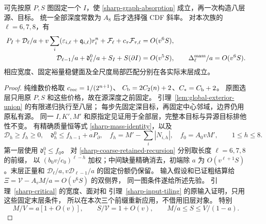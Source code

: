 \begin{lemma}[同一八层族的三个前缀]\label{eighth:priors}
可先按原 \(P,S\) 图固定一个 \(I\)，使
\eqref{sharp-graph-absorption} 成立，再一次构造八层源、目标。
统一全部深度常数为 \(A_8\) 后才选择强 CDF 斜率。
对本次族的 \(\ell=6,7,8\)，有
\begin{align}
 P_I+\mathcal D_\ell/a+v\sum_i(\varepsilon_{i,\ell}+\mathfrak q_{i,\ell})r_i^n
 +\mathcal F_\ell+c_\tau\mathcal F_{\tau,\ell}&=O(v^6S),
 \label{eighth:positive-prior}\\
 \mathcal D_{\ell-1}/a+\mathfrak d_\ell^0/a+S_I+S(\partial I)&=O(v^5S),
 \qquad \Delta_\ell^{\rm mass}/a=O(v^6S).
 \label{eighth:mass-prior}
\end{align}
相应宽度、固定裕量稳健面及全尺度局部匹配分别在各实际末层成立。
\end{lemma}
\begin{proof}
纯维数价格取 \(c_{\rm rec}=1/(2^{n+1})\)、
\(C_{\rm b}=2C_2(n)+2\)、\(C_*=C_{\rm b}+2\)。
原图选层只用原 \(P,S\) 和这些价格，故在源深度之前固定。
引理~\ref{lem:global-exterior-union} 的有限递归执行至八层；
每步先固定深目标，再固定中心邻域，边界仍用原私有源。
同一 \(I,K',M'\) 和原指定见证用于全部层，完整本目标与异源目标排他性不变。
有精确质量恒等式 \eqref{sharp-mass-identity}，以及
\begin{equation}\label{eighth:depth}
 \mathcal D_h\ge f_h\ge0,\quad
 \mathfrak d_h^0\le f_{h-1}+aP_\partial,\quad
 f_h=M'-\sum_i|N_{i,h}|,\quad f_0=A_0vM',\qquad1\le h\le8.
\end{equation}
第一层使用 \(\mathfrak d_1^0\le f_0\)。
对 \eqref{sharp-coarse-retained-recursion} 分别取长度 \(\ell=6,7,8\) 的前缀，
以 \((b_0v/c_0)^{\ell-h}\) 加权；中间缺量精确消去，初端除 \(a\) 为
\(O(v^{\ell+1}S)\)。末层正量和
\(\mathcal D_\ell/a,v\mathcal D_{\ell-1}/a\) 的固定份额仍保留。
输入假设和已证粗结算给
\(\Xi=\mathcal V-A_vM/a=O(v^6S)\) 的双侧界，
同一图条件遂给所述先验。
引理~\ref{sharp-critical} 的宽度、面对和
引理~\ref{sharp-input-tiling} 的原输入证明，只用这些固定末层条件，
所以在本次三个前缀重新应用，不借用旧层对象。
特别
\begin{equation}\label{eighth:leading-mass}
 M/V=a[1+O(v)],\qquad S/\mathcal V=1+O(v),\qquad
 M/a\le S\le V/(1-a).
\end{equation}
\end{proof}


